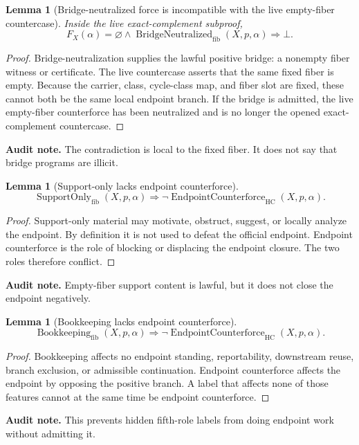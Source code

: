 \documentclass[11pt]{article}
\newtheorem{lemma}[theorem]{Lemma}
\newcommand{\HC}{\operatorname{HC}}
\begin{document}
\begin{lemma}[Bridge-neutralized force is incompatible with the live empty-fiber countercase]\label{lem:bridge-neutralized-incompatible}
Inside the live exact-complement subproof,
\[
F_X(\alpha)=\varnothing\wedge \operatorname{BridgeNeutralized}_{\mathrm{fib}}(X,p,\alpha)\Rightarrow \bot.
\]
\end{lemma}
\begin{proof}
Bridge-neutralization supplies the lawful positive bridge: a nonempty fiber witness or certificate.  The live countercase asserts that the same fixed fiber is empty.  Because the carrier, class, cycle-class map, and fiber slot are fixed, these cannot both be the same local endpoint branch.  If the bridge is admitted, the live empty-fiber counterforce has been neutralized and is no longer the opened exact-complement countercase.
\end{proof}
\par\noindent\textbf{Audit note.} The contradiction is local to the fixed fiber.  It does not say that bridge programs are illicit.

\begin{lemma}[Support-only lacks endpoint counterforce]\label{lem:support-lacks-counterforce}
\[
\operatorname{SupportOnly}_{\mathrm{fib}}(X,p,\alpha)
\Rightarrow \neg\operatorname{EndpointCounterforce}_{\HC}(X,p,\alpha).
\]
\end{lemma}
\begin{proof}
Support-only material may motivate, obstruct, suggest, or locally analyze the endpoint.  By definition it is not used to defeat the official endpoint.  Endpoint counterforce is the role of blocking or displacing the endpoint closure.  The two roles therefore conflict.
\end{proof}
\par\noindent\textbf{Audit note.} Empty-fiber support content is lawful, but it does not close the endpoint negatively.

\begin{lemma}[Bookkeeping lacks endpoint counterforce]\label{lem:bookkeeping-lacks-counterforce}
\[
\operatorname{Bookkeeping}_{\mathrm{fib}}(X,p,\alpha)
\Rightarrow \neg\operatorname{EndpointCounterforce}_{\HC}(X,p,\alpha).
\]
\end{lemma}
\begin{proof}
Bookkeeping affects no endpoint standing, reportability, downstream reuse, branch exclusion, or admissible continuation.  Endpoint counterforce affects the endpoint by opposing the positive branch.  A label that affects none of those features cannot at the same time be endpoint counterforce.
\end{proof}
\par\noindent\textbf{Audit note.} This prevents hidden fifth-role labels from doing endpoint work without admitting it.
\end{document}
